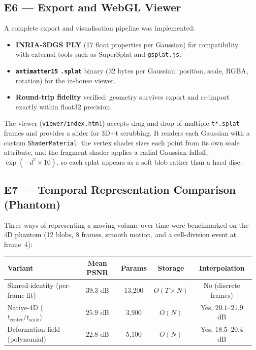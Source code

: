 \documentclass[11pt,a4paper]{article}
\newcommand{\code}[1]{\texttt{#1}}
\begin{document}
\subsection{E6 --- Export and WebGL Viewer}

A complete export and visualisation pipeline was implemented:

\begin{itemize}
    \item \textbf{INRIA-3DGS PLY} (17 float properties per Gaussian) for compatibility
    with external tools such as SuperSplat and \code{gsplat.js}.
    \item \textbf{\code{antimatter15} \code{.splat}} binary (32 bytes per Gaussian:
    position, scale, RGBA, rotation) for the in-house viewer.
    \item \textbf{Round-trip fidelity} verified: geometry survives export and re-import
    exactly within float32 precision.
\end{itemize}

The viewer (\code{viewer/index.html}) accepts drag-and-drop of multiple \code{t*.splat}
frames and provides a slider for 3D+t scrubbing. It renders each Gaussian with a custom
\code{ShaderMaterial}: the vertex shader sizes each point from its own scale attribute,
and the fragment shader applies a radial Gaussian falloff,
\(\exp(-d^2 \times 10)\), so each splat appears as a soft blob rather than a hard disc.

\subsection{E7 --- Temporal Representation Comparison (Phantom)}

Three ways of representing a moving volume over time were benchmarked on the 4D phantom
(12 blobs, 8 frames, smooth motion, and a cell-division event at frame~4):

\begin{table}[h!]
\centering
\small
\begin{tabularx}{\textwidth}{@{}p{}cccc@{}}
\toprule
\textbf{Variant} & \textbf{Mean PSNR} & \textbf{Params} & \textbf{Storage} & \textbf{Interpolation} \\
\midrule
Shared-identity (per-frame fit) & \(39.3\) dB & 13{,}200 & \(O(T \times N)\) & No (discrete frames) \\
Native-4D (\(t_{\mathrm{center}}/t_{\mathrm{scale}}\)) & \(25.9\) dB & 3{,}900 & \(O(N)\) & Yes, \(20.1\)--\(21.9\) dB \\
Deformation field (polynomial) & \(22.8\) dB & 5{,}100 & \(O(N)\) & Yes, \(18.5\)--\(20.4\) dB \\
\bottomrule
\end{tabularx}
\end{table}
\end{document}
